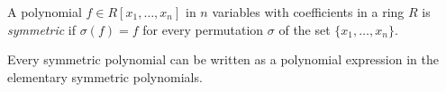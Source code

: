 \documentclass{article}
\begin{document}
A polynomial $f \in R[x_1, \dots, x_n]$ in $n$ variables with coefficients in a ring $R$ is {\em symmetric} if $\sigma(f) = f$ for every permutation $\sigma$ of the set $\{x_1, \dots, x_n\}$.

Every symmetric polynomial can be written as a polynomial expression in the elementary symmetric polynomials.
\end{document}
